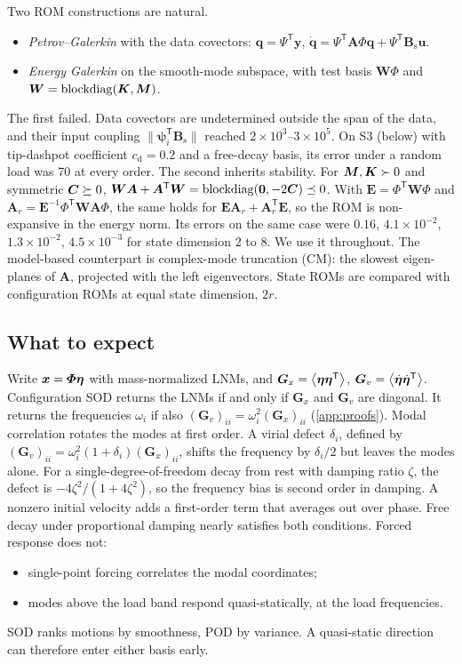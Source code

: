 \documentclass[preprint,12pt]{elsarticle}
\begin{document}
Two ROM constructions are natural.
\begin{itemize}
\item \emph{Petrov--Galerkin} with the data covectors: $\bm{q}=\bm{\varPsi}^{\mathsf T}\bm{y}$, $\dot{\bm{q}}=\bm{\varPsi}^{\mathsf T}\bm{A}\bm{\varPhi}\bm{q}+\bm{\varPsi}^{\mathsf T}\bm{B}_{\mathrm s}\bm{u}$.
\item \emph{Energy Galerkin} on the smooth-mode subspace, with test basis $\bm{W}\bm{\varPhi}$ and $\bm{W}=\operatorname{blockdiag}(\bm{K},\bm{M})$.
\end{itemize}
The first failed. Data covectors are undetermined outside the span of the data, and their input coupling $\|\bm{\psi}_i^{\mathsf T}\bm{B}_{\mathrm s}\|$ reached $2\times10^3$--$3\times10^5$. On S3 (below) with tip-dashpot coefficient $c_{\mathrm d}=0.2$ and a free-decay basis, its error under a random load was 70 at every order.
The second inherits stability. For $\bm{M},\bm{K}\succ0$ and symmetric $\bm{C}\succeq0$, $\bm{W}\bm{A}+\bm{A}^{\mathsf T}\bm{W}=\operatorname{blockdiag}(\mathbf 0,-2\bm{C})\preceq0$. With $\bm{E}=\bm{\varPhi}^{\mathsf T}\bm{W}\bm{\varPhi}$ and $\bm{A}_r=\bm{E}^{-1}\bm{\varPhi}^{\mathsf T}\bm{W}\bm{A}\bm{\varPhi}$, the same holds for $\bm{E}\bm{A}_r+\bm{A}_r^{\mathsf T}\bm{E}$, so the ROM is non-expansive in the energy norm. Its errors on the same case were $0.16$, $4.1\times10^{-2}$, $1.3\times10^{-2}$, $4.5\times10^{-3}$ for state dimension 2 to 8. We use it throughout.
The model-based counterpart is complex-mode truncation (CM): the slowest eigen-planes of $\bm{A}$, projected with the left eigenvectors.
State ROMs are compared with configuration ROMs at equal state dimension, $2r$.

\subsection{What to expect}\label{sec:expect}
Write $\bm{x}=\bm{\varPhi}\bm{\eta}$ with mass-normalized LNMs, and $\bm{G}_x=\left\langle \bm{\eta}\bm{\eta}^{\mathsf T} \right\rangle$, $\bm{G}_v=\left\langle \dot{\bm{\eta}}\dot{\bm{\eta}}^{\mathsf T} \right\rangle$.
Configuration SOD returns the LNMs if and only if $\bm{G}_x$ and $\bm{G}_v$ are diagonal. It returns the frequencies $\omega_i$ if also $(\bm{G}_v)_{ii}=\omega_i^2(\bm{G}_x)_{ii}$ (\ref{app:proofs}).
Modal correlation rotates the modes at first order. A virial defect $\delta_i$, defined by $(\bm{G}_v)_{ii}=\omega_i^2(1+\delta_i)(\bm{G}_x)_{ii}$, shifts the frequency by $\delta_i/2$ but leaves the modes alone.
For a single-degree-of-freedom decay from rest with damping ratio $\zeta$, the defect is $-4\zeta^2/(1+4\zeta^2)$, so the frequency bias is second order in damping. A nonzero initial velocity adds a first-order term that averages out over phase.
Free decay under proportional damping nearly satisfies both conditions. Forced response does not:
\begin{itemize}
\item single-point forcing correlates the modal coordinates;
\item modes above the load band respond quasi-statically, at the load frequencies.
\end{itemize}
SOD ranks motions by smoothness, POD by variance. A quasi-static direction can therefore enter either basis early.
\end{document}
